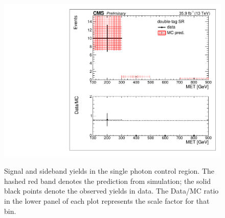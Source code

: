 \begin{figure}[hb!]
 \includegraphics[trim={5px 5px 5px 5px},clip,width=0.425\linewidth]{figs/ABCDscaleFactors_MET_double-tagSR_photon.pdf}\\
 \caption{
Signal and sideband yields in the single photon control region. The hashed red band denotes the prediction from simulation; the solid black points denote the observed yields in data. The Data/MC ratio in the lower panel of each plot represents the scale factor for that bin.
 }
\label{fig:closurephoton}
\end{figure}

